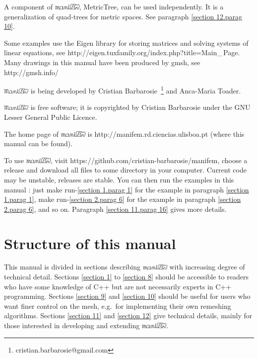 \documentclass[a4paper]{scrreprt}
\def\numb{}
\newcommand\ManiFEM{\leavevmode\hbox{\includegraphics[width=13mm]{manifem-large}}}
\newcommand\maniFEM{\leavevmode\hbox{\includegraphics[width=13mm]{manifem-small}}}
\renewcommand\tt{\normalfont\ttfamily}
\begin{document}
A component of \maniFEM, {\small\tt MetricTree}, can be used independently.
It is a generalization of quad-trees for metric spaces.
See paragraph \ref{\numb section 12.\numb parag 10}.

Some examples use the {\small\tt Eigen} library for  storing matrices and solving systems of
linear equations, see {\small\tt http://eigen.tuxfamily.org/index.php?title=Main\_\,Page}.
Many drawings in this manual have been produced by {\small\tt gmsh}, see
{\small\tt http://gmsh.info/}

{\ManiFEM} is being developed by Cristian Barbarosie\,%
\footnote {\small\tt cristian.barbarosie@gmail.com}
and Anca-Maria Toader.

{\ManiFEM} is free software; it is copyrighted by Cristian Barbarosie
under the GNU Lesser General Public Licence.

The home page of {\maniFEM} is {\small\tt http://manifem.rd.ciencias.ulisboa.pt}
(where this manual can be found).

To use \maniFEM, visit {\small\tt https://github.com/cristian-barbarosie/manifem},
choose a release and download all files to some directory in your computer.
Current code may be unstable, releases are stable.
You can then run the examples in this manual :
just {\small\tt make run-\ref{\numb section 1.\numb parag 1}}
for the example in paragraph \ref{\numb section 1.\numb parag 1},
{\small\tt make run-\ref{\numb section 2.\numb parag 6}}
for the example in paragraph \ref{\numb section 2.\numb parag 6}, and so on.
Paragraph \ref{\numb section 11.\numb parag 16} gives more details.
\vfil\eject


\section*{Structure of this manual}

This manual is divided in sections describing {\maniFEM} with increasing degree of technical
detail.
Sections \ref{\numb section 1} to \ref{\numb section 8} should be accessible to readers
who have some knowledge of {\tt C++} but are not necessarily experts in {\tt C++} programming.
Sections \ref{\numb section 9} and \ref{\numb section 10} should be useful for users
who want finer control on the mesh, e.g.\ for implementing their own remeshing algorithms.
Sections \ref{\numb section 11} and \ref{\numb section 12} give technical details,
mainly for those interested in developing and extending \maniFEM.
\end{document}
